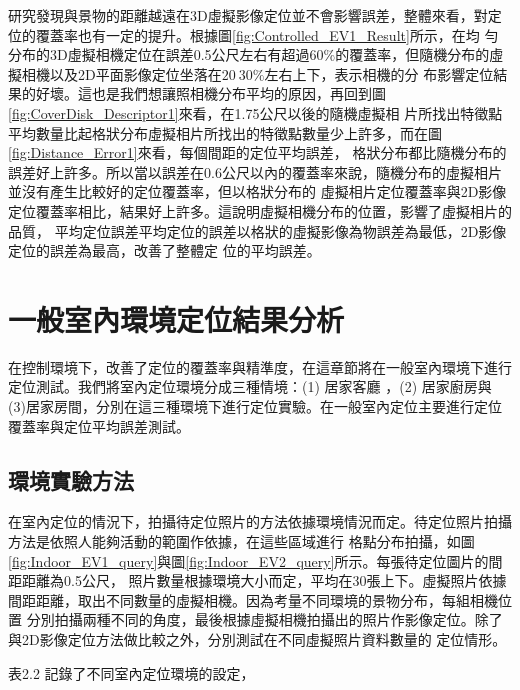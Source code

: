 	研究發現與景物的距離越遠在3D虛擬影像定位並不會影響誤差，整體來看，對定位的覆蓋率也有一定的提升。根據圖\ref{fig:Controlled_EV1_Result}所示，在均
勻分布的3D虛擬相機定位在誤差0.5公尺左右有超過$60\%$的覆蓋率，但隨機分布的虛擬相機以及2D平面影像定位坐落在$20~30\%$左右上下，表示相機的分
布影響定位結果的好壞。這也是我們想讓照相機分布平均的原因，再回到圖\ref{fig:CoverDisk_Descriptor1}來看，在1.75公尺以後的隨機虛擬相
片所找出特徵點平均數量比起格狀分布虛擬相片所找出的特徵點數量少上許多，而在圖\ref{fig:Distance_Error1}來看，每個間距的定位平均誤差，
格狀分布都比隨機分布的誤差好上許多。所以當以誤差在0.6公尺以內的覆蓋率來說，隨機分布的虛擬相片並沒有產生比較好的定位覆蓋率，但以格狀分布的
虛擬相片定位覆蓋率與2D影像定位覆蓋率相比，結果好上許多。這說明虛擬相機分布的位置，影響了虛擬相片的品質，
平均定位誤差平均定位的誤差以格狀的虛擬影像為物誤差為最低，2D影像定位的誤差為最高，改善了整體定
位的平均誤差。

	
\section{一般室內環境定位結果分析}

	在控制環境下，改善了定位的覆蓋率與精準度，在這章節將在一般室內環境下進行定位測試。我們將室內定位環境分成三種情境：(1)
居家客廳 ，(2) 居家廚房與 (3)居家房間，分別在這三種環境下進行定位實驗。在一般室內定位主要進行定位覆蓋率與定位平均誤差測試。
	
\subsection{環境實驗方法}
	
	在室內定位的情況下，拍攝待定位照片的方法依據環境情況而定。待定位照片拍攝方法是依照人能夠活動的範圍作依據，在這些區域進行
格點分布拍攝，如圖\ref{fig:Indoor_EV1_query}與圖\ref{fig:Indoor_EV2_query}所示。每張待定位圖片的間距距離為0.5公尺，
照片數量根據環境大小而定，平均在30張上下。虛擬照片依據間距距離，取出不同數量的虛擬相機。因為考量不同環境的景物分布，每組相機位置
分別拍攝兩種不同的角度，最後根據虛擬相機拍攝出的照片作影像定位。除了與2D影像定位方法做比較之外，分別測試在不同虛擬照片資料數量的
定位情形。
		
	
	
	表2.2 記錄了不同室內定位環境的設定，
	
